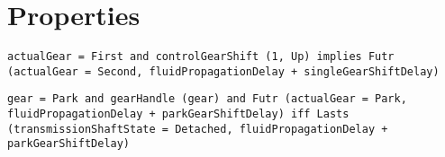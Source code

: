 \section{Properties}
\label{Section:Properties}

\begin{lstlisting}[language=TRIO,basicstyle=\small,breaklines,breakatwhitespace,frame=single,caption=Property 1,label=Code:Property1]
actualGear = First and controlGearShift (1, Up) implies Futr (actualGear = Second, fluidPropagationDelay + singleGearShiftDelay)
\end{lstlisting}

\begin{lstlisting}[language=TRIO,basicstyle=\small,breaklines,breakatwhitespace,frame=single,caption=Property 2,label=Code:Property2]
gear = Park and gearHandle (gear) and Futr (actualGear = Park, fluidPropagationDelay + parkGearShiftDelay) iff Lasts (transmissionShaftState = Detached, fluidPropagationDelay + parkGearShiftDelay)
\end{lstlisting}
